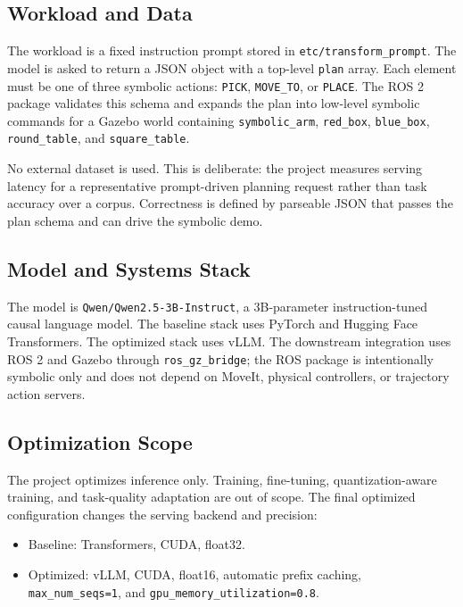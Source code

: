 \documentclass[conference]{IEEEtran}
\begin{document}
\subsection{Workload and Data}

The workload is a fixed instruction prompt stored in \texttt{etc/transform\_prompt}. The model is asked to return a JSON object with a top-level \texttt{plan} array. Each element must be one of three symbolic actions: \texttt{PICK}, \texttt{MOVE\_TO}, or \texttt{PLACE}. The ROS 2 package validates this schema and expands the plan into low-level symbolic commands for a Gazebo world containing \texttt{symbolic\_arm}, \texttt{red\_box}, \texttt{blue\_box}, \texttt{round\_table}, and \texttt{square\_table}.

No external dataset is used. This is deliberate: the project measures serving latency for a representative prompt-driven planning request rather than task accuracy over a corpus. Correctness is defined by parseable JSON that passes the plan schema and can drive the symbolic demo.

\subsection{Model and Systems Stack}

The model is \texttt{Qwen/Qwen2.5-3B-Instruct}, a 3B-parameter instruction-tuned causal language model. The baseline stack uses PyTorch and Hugging Face Transformers. The optimized stack uses vLLM. The downstream integration uses ROS 2 and Gazebo through \texttt{ros\_gz\_bridge}; the ROS package is intentionally symbolic only and does not depend on MoveIt, physical controllers, or trajectory action servers.

\subsection{Optimization Scope}

The project optimizes inference only. Training, fine-tuning, quantization-aware training, and task-quality adaptation are out of scope. The final optimized configuration changes the serving backend and precision:

\begin{itemize}
\item Baseline: Transformers, CUDA, float32.
\item Optimized: vLLM, CUDA, float16, automatic prefix caching, \texttt{max\_num\_seqs=1}, and \texttt{gpu\_memory\_utilization=0.8}.
\end{itemize}
\end{document}
